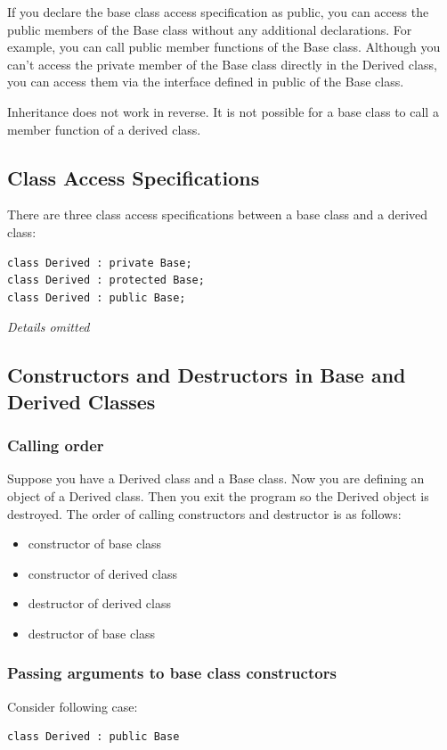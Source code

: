 \documentclass[12pt]{book}
\begin{document}
If you declare the base class access specification as public, you can access the public members of the Base class without any additional declarations. For example, you can call  public member functions of the Base class. Although you can't access the private member of the Base class directly in the Derived class, you can access them via the interface defined in public of the Base class.

Inheritance does not work in reverse. It is not possible for a base class to call a member function of a derived class.

\subsection{Class Access Specifications}
\label{sec:org7dd71fc}
There are three class access specifications between a base class and a derived class:
\begin{verbatim}
class Derived : private Base;
class Derived : protected Base;
class Derived : public Base;
\end{verbatim}

\emph{Details omitted}

\subsection{Constructors and Destructors in Base and Derived Classes}
\label{sec:org818ca2d}
\subsubsection{Calling order}
\label{sec:org9516779}
Suppose you have a Derived class and a Base class. Now you are defining an object of a Derived class. Then you exit the program so the Derived object is destroyed. The order of calling constructors and destructor is as follows:
\begin{itemize}
\item constructor of base class
\item constructor of derived class
\item destructor of derived class
\item destructor of base class
\end{itemize}

\subsubsection{Passing arguments to base class constructors}
\label{sec:org3476747}
Consider following case:
\begin{verbatim}
class Derived : public Base
\end{verbatim}
\end{document}
